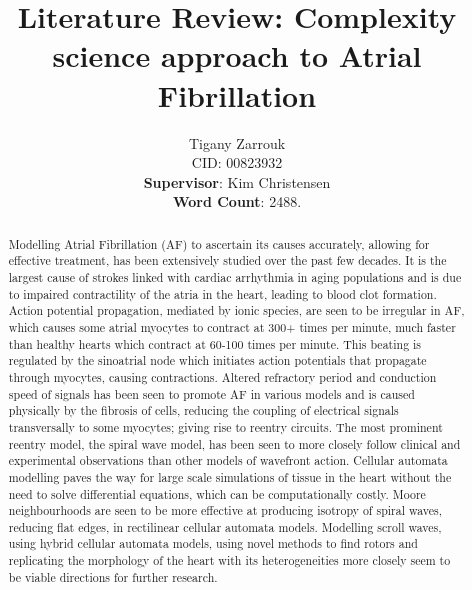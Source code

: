\documentclass[twocolumn]{article}
\begin{document}
\title {\textbf{Literature Review: Complexity science approach to Atrial Fibrillation}}
\author{Tigany Zarrouk\\ CID: 00823932\\\textbf{Supervisor}: Kim Christensen \\\textbf{Word Count}: 2488.}

\date{}
\maketitle





\begin{abstract}

Modelling Atrial Fibrillation (AF) to ascertain its causes accurately, allowing for effective treatment, has been extensively studied over the past few decades. It is the largest cause of strokes linked with cardiac arrhythmia in aging populations and is due to impaired contractility of the atria in the heart, leading to blood clot formation. Action potential propagation, mediated by ionic species, are seen to be irregular in AF, which causes some atrial myocytes to contract at 300+ times per minute, much faster than healthy hearts which contract at 60-100 times per minute. This beating is regulated by the sinoatrial node which initiates action potentials that propagate through myocytes, causing contractions. Altered refractory period and conduction speed of signals has been seen to promote AF in various models and is caused physically by the fibrosis of cells, reducing the coupling of electrical signals transversally to some myocytes; giving rise to reentry circuits. The most prominent reentry model, the spiral wave model, has been seen to more closely follow clinical and experimental observations than other models of wavefront action. Cellular automata modelling paves the way for large scale simulations of tissue in the heart without the need to solve differential equations, which can be computationally costly. Moore neighbourhoods are seen to be more effective at producing isotropy of spiral waves, reducing flat edges, in rectilinear cellular automata models. Modelling scroll waves, using hybrid cellular automata models, using novel methods to find rotors and replicating the morphology of the heart with its heterogeneities more closely seem to be viable directions for further research. 

\end{abstract}
\end{document}
